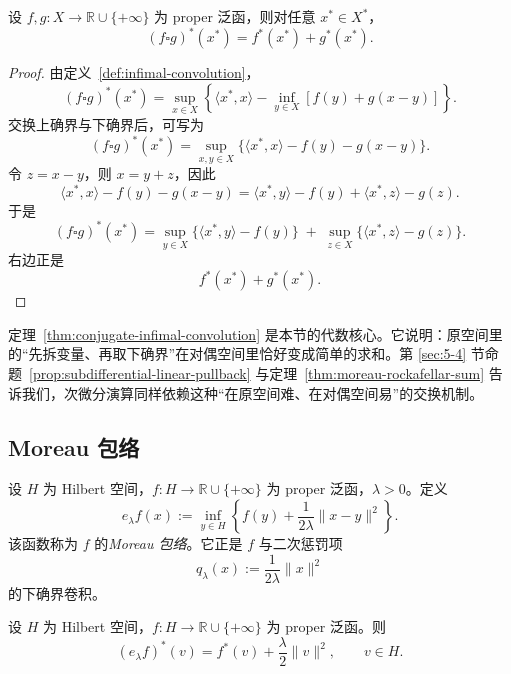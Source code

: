 \begin{theorem}[下确界卷积的共轭交换公式]\label{thm:conjugate-infimal-convolution}
设 $f,g\colon X\to \mathbb R\cup\{+\infty\}$ 为 proper 泛函，则对任意 $x^\ast\in X^\ast$，
\[
(f\square g)^\ast(x^\ast)=f^\ast(x^\ast)+g^\ast(x^\ast).
\]
\end{theorem}

\begin{proof}
由定义~\ref{def:infimal-convolution}，
\[
(f\square g)^\ast(x^\ast)
=
\sup_{x\in X}\left\{\langle x^\ast,x\rangle-\inf_{y\in X}[f(y)+g(x-y)]\right\}.
\]
交换上确界与下确界后，可写为
\[
(f\square g)^\ast(x^\ast)
=
\sup_{x,y\in X}\{\langle x^\ast,x\rangle-f(y)-g(x-y)\}.
\]
令 $z=x-y$，则 $x=y+z$，因此
\[
\langle x^\ast,x\rangle-f(y)-g(x-y)
=
\langle x^\ast,y\rangle-f(y)+\langle x^\ast,z\rangle-g(z).
\]
于是
\[
(f\square g)^\ast(x^\ast)
=
\sup_{y\in X}\{\langle x^\ast,y\rangle-f(y)\}
\;+\;
\sup_{z\in X}\{\langle x^\ast,z\rangle-g(z)\}.
\]
右边正是
\[
f^\ast(x^\ast)+g^\ast(x^\ast).
\]
\end{proof}

\begin{remark}
定理~\ref{thm:conjugate-infimal-convolution} 是本节的代数核心。它说明：原空间里的“先拆变量、再取下确界”在对偶空间里恰好变成简单的求和。第 \ref{sec:5-4} 节命题~\ref{prop:subdifferential-linear-pullback} 与定理~\ref{thm:moreau-rockafellar-sum} 告诉我们，次微分演算同样依赖这种“在原空间难、在对偶空间易”的交换机制。
\end{remark}

\subsection{Moreau 包络}

\begin{definition}[Moreau 包络]\label{def:moreau-envelope}
设 $H$ 为 Hilbert 空间，$f\colon H\to \mathbb R\cup\{+\infty\}$ 为 proper 泛函，$\lambda>0$。定义
\[
e_\lambda f(x):=\inf_{y\in H}\left\{f(y)+\frac{1}{2\lambda}\|x-y\|^2\right\}.
\]
该函数称为 $f$ 的\emph{Moreau 包络}。它正是 $f$ 与二次惩罚项
\[
q_\lambda(x):=\frac{1}{2\lambda}\|x\|^2
\]
的下确界卷积。
\end{definition}

\begin{proposition}\label{prop:moreau-envelope-conjugate}
设 $H$ 为 Hilbert 空间，$f\colon H\to \mathbb R\cup\{+\infty\}$ 为 proper 泛函。则
\[
(e_\lambda f)^\ast(v)=f^\ast(v)+\frac{\lambda}{2}\|v\|^2,\qquad v\in H.
\]
\end{proposition}

